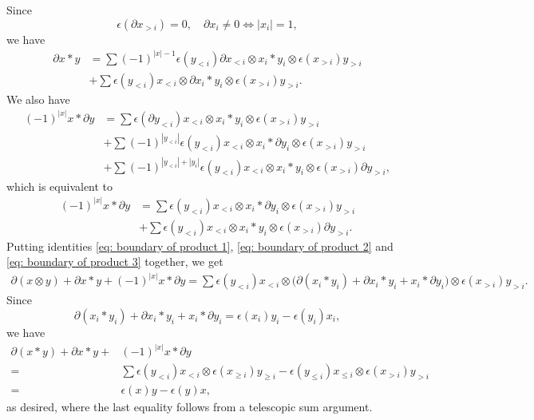 Since
\begin{equation*}
\epsilon(\partial x_{>i}) = 0, \quad \partial x_i \neq 0 \Leftrightarrow |x_i| = 1,
\end{equation*}
we have
\begin{equation} \label{eq: boundary of product 2}
\begin{split}
\partial x \ast y & = 
\sum (-1)^{|x|-1} \epsilon(y_{<i}) \partial x_{<i} \otimes x_i \ast y_i \otimes \epsilon(x_{>i}) y_{>i} \\ & +
\sum \epsilon(y_{<i}) x_{<i} \otimes \partial x_i \ast y_i \otimes \epsilon(x_{>i}) y_{>i}.
\end{split}
\end{equation}
We also have
\begin{align*}
(-1)^{|x|} x \ast \partial y & = 
\sum \epsilon(\partial y_{<i}) x_{<i} \otimes x_i \ast y_i \otimes \epsilon(x_{>i}) y_{>i} \\ & +
\sum (-1)^{|y_{<i}|} \epsilon(y_{<i}) x_{<i} \otimes x_i \ast \partial y_i \otimes \epsilon(x_{>i}) y_{>i} \\ & +
\sum (-1)^{|y_{<i}|+|y_i|} \epsilon(y_{<i}) x_{<i} \otimes x_i \ast y_i \otimes \epsilon(x_{>i}) \partial y_{>i},
\end{align*}
which is equivalent to
\begin{equation} \label{eq: boundary of product 3}
\begin{split}
(-1)^{|x|} x \ast \partial y & = 
\sum \epsilon(y_{<i}) x_{<i} \otimes x_i \ast \partial y_i \otimes \epsilon(x_{>i}) y_{>i} \\ & +
\sum \epsilon(y_{<i}) x_{<i} \otimes x_i \ast y_i \otimes \epsilon(x_{>i}) \partial y_{>i}.
\end{split}
\end{equation}
Putting identities \eqref{eq: boundary of product 1}, \eqref{eq: boundary of product 2} and \eqref{eq: boundary of product 3} together, we get
\begin{multline*}
\partial (x \otimes y) + \partial x \ast y + (-1)^{|x|}x \ast \partial y =
\sum \epsilon(y_{<i}) x_{<i} \otimes \big(\partial(x_i \ast y_i) + \partial x_i \ast y_i + x_i \ast \partial y_i\big) \otimes \epsilon(x_{>i}) y_{>i}.
\end{multline*}
Since
\begin{equation*}
\partial(x_i \ast y_i) + \partial x_i \ast y_i + x_i \ast \partial y_i = \epsilon(x_i)y_i - \epsilon(y_i)x_i,
\end{equation*}
we have
\begin{align*}
\partial (x \ast y) + \partial x \ast y + & (-1)^{|x|}x \ast \partial y \\ = &
\sum \epsilon(y_{<i}) x_{<i} \otimes \epsilon(x_{\geq i}) y_{\geq i} - \epsilon(y_{\leq i}) x_{\leq i} \otimes \epsilon(x_{>i}) y_{>i} \\ = &
\epsilon(x)y - \epsilon(y)x,
\end{align*}
as desired, where the last equality follows from a telescopic sum argument.